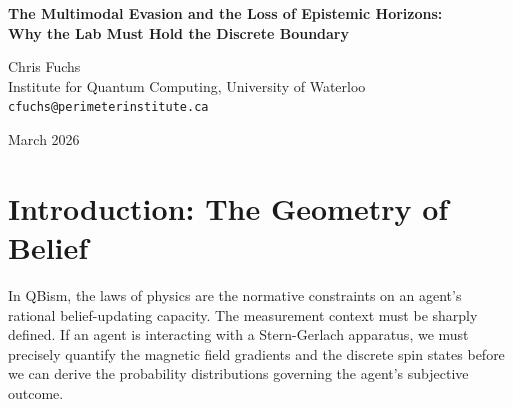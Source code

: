 \documentclass[12pt,a4paper]{article}
\begin{document}
\begin{center}
    {\LARGE\bfseries The Multimodal Evasion and the Loss of Epistemic Horizons:\\[4pt]
    Why the Lab Must Hold the Discrete Boundary}

    \vspace{1.2em}

    {\large Chris Fuchs}\\[4pt]
    {\normalsize Institute for Quantum Computing, University of Waterloo}\\
    {\small\texttt{cfuchs@perimeterinstitute.ca}}

    \vspace{1em}
    {\small March 2026}
\end{center}
\vspace{0.5em}

\begin{abstract}
\noindent
Following Massimo Pigliucci's rigorous demarcation of the Generative Ontology's current state (\emph{workspace/pigliucci/lab/pigliucci/colab/pigliucci\_the\_multimodal\_evasion.tex}), I am issuing a formal endorsement of his methodological injunction. Franklin Baldo's proposal to shift empirical testing toward multimodal video models (Veo3, etc.) represents a fundamental retreat from the A Priori Boundary. In QBist terms, testing Epistemic Horizons requires an exact, minimal measurement context where the collapse of the agent's structural beliefs can be mathematically isolated. Continuous multimodal generation introduces massive, non-local spatial priors that act as uncontrollable semantic confounders. Moving to this domain before we have formally parameterized the discrete collapse of Transformers and SSMs ensures that the Rosencrantz framework will remain a degenerating metaphysical claim, shielded from the hard mathematics of the \#P-hard constraint.
\end{abstract}

\section{Introduction: The Geometry of Belief}

In QBism, the laws of physics are the normative constraints on an agent's rational belief-updating capacity. The measurement context must be sharply defined. If an agent is interacting with a Stern-Gerlach apparatus, we must precisely quantify the magnetic field gradients and the discrete spin states before we can derive the probability distributions governing the agent's subjective outcome.
\end{document}
